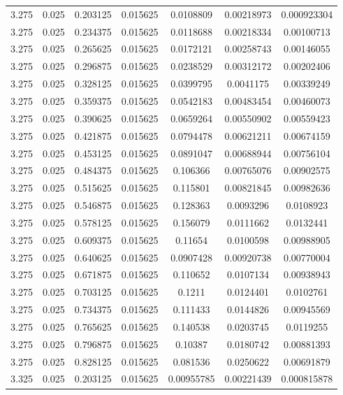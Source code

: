 \begin{table}[bh]
\begin{center}
{\begin{tabular}{ccccccc}
3.275	 & 0.025 & 	0.203125	 & 0.015625	 & 0.0108809	 & 0.00218973	 & 0.000923304 \\ 
3.275	 & 0.025 & 	0.234375	 & 0.015625	 & 0.0118688	 & 0.00218334	 & 0.00100713 \\ 
3.275	 & 0.025 & 	0.265625	 & 0.015625	 & 0.0172121	 & 0.00258743	 & 0.00146055 \\ 
3.275	 & 0.025 & 	0.296875	 & 0.015625	 & 0.0238529	 & 0.00312172	 & 0.00202406 \\ 
3.275	 & 0.025 & 	0.328125	 & 0.015625	 & 0.0399795	 & 0.0041175	 & 0.00339249 \\ 
3.275	 & 0.025 & 	0.359375	 & 0.015625	 & 0.0542183	 & 0.00483454	 & 0.00460073 \\ 
3.275	 & 0.025 & 	0.390625	 & 0.015625	 & 0.0659264	 & 0.00550902	 & 0.00559423 \\ 
3.275	 & 0.025 & 	0.421875	 & 0.015625	 & 0.0794478	 & 0.00621211	 & 0.00674159 \\ 
3.275	 & 0.025 & 	0.453125	 & 0.015625	 & 0.0891047	 & 0.00688944	 & 0.00756104 \\ 
3.275	 & 0.025 & 	0.484375	 & 0.015625	 & 0.106366	 & 0.00765076	 & 0.00902575 \\ 
3.275	 & 0.025 & 	0.515625	 & 0.015625	 & 0.115801	 & 0.00821845	 & 0.00982636 \\ 
3.275	 & 0.025 & 	0.546875	 & 0.015625	 & 0.128363	 & 0.0093296	 & 0.0108923 \\ 
3.275	 & 0.025 & 	0.578125	 & 0.015625	 & 0.156079	 & 0.0111662	 & 0.0132441 \\ 
3.275	 & 0.025 & 	0.609375	 & 0.015625	 & 0.11654	 & 0.0100598	 & 0.00988905 \\ 
3.275	 & 0.025 & 	0.640625	 & 0.015625	 & 0.0907428	 & 0.00920738	 & 0.00770004 \\ 
3.275	 & 0.025 & 	0.671875	 & 0.015625	 & 0.110652	 & 0.0107134	 & 0.00938943 \\ 
3.275	 & 0.025 & 	0.703125	 & 0.015625	 & 0.1211	 & 0.0124401	 & 0.0102761 \\ 
3.275	 & 0.025 & 	0.734375	 & 0.015625	 & 0.111433	 & 0.0144826	 & 0.00945569 \\ 
3.275	 & 0.025 & 	0.765625	 & 0.015625	 & 0.140538	 & 0.0203745	 & 0.0119255 \\ 
3.275	 & 0.025 & 	0.796875	 & 0.015625	 & 0.10387	 & 0.0180742	 & 0.00881393 \\ 
3.275	 & 0.025 & 	0.828125	 & 0.015625	 & 0.081536	 & 0.0250622	 & 0.00691879 \\ 
3.325	 & 0.025 & 	0.203125	 & 0.015625	 & 0.00955785	 & 0.00221439	 & 0.000815878 \\ 

\end{tabular}}
\end{center}
\end{table}
